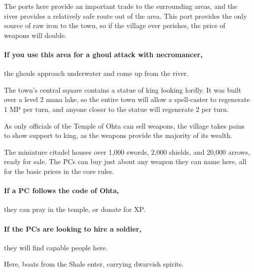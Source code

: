 \begin{multicols}{2}
The ports here provide an important trade to the surrounding areas, and the river provides a relatively safe route out of the area.
This port provides the only  source of raw iron to the town, so if the village ever perishes, the price of weapons will double.

\paragraph{If you use this area for a ghoul attack with \gls{necromancer},}
the ghouls approach underwater and come up from the river.


The town's central square contains a statue of \gls{king} looking lordly.
It was built over a level 2 mana lake, so the entire town will allow a spell-caster to regenerate 1 MP per turn, and anyone closer to the statue will regenerate 2 per turn.

As only officials of the Temple of Ohta can sell weapons, the village takes pains to show support to \gls{king}, as the weapons provide the majority of its wealth.


The miniature citadel houses over 1,000 swords, 2,000 shields, and 20,000 arrows, ready for sale.
The PCs can buy just about any weapon they can name here, all for the basic prices in the core rules.

\paragraph{If a PC follows the code of Ohta,}
they can pray in the temple, or donate for XP.

\paragraph{If the PCs are looking to hire a soldier,}
they will find capable people here.


Here, boats from the Shale enter, carrying dwarvish spirits.

\end{multicols}

